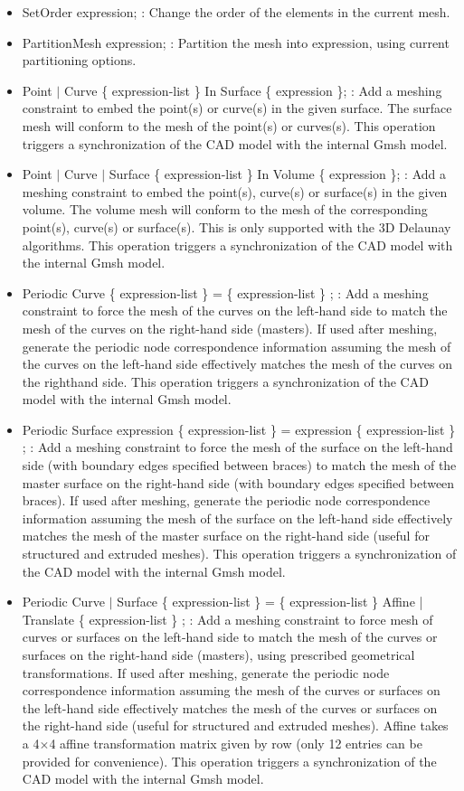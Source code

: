 \documentclass[dvipdfmx, 9pt, a4paper]{article}
\numberwithin{equation}{section}
\begin{document}
\begin{itemize}
\item SetOrder expression; : Change the order of the elements in the current mesh.
\item PartitionMesh expression; : Partition the mesh into expression, using current partitioning options.
\item Point $|$ Curve \{ expression-list \} In Surface \{ expression \}; : Add a meshing constraint to embed the point(s) or curve(s) in the given surface. The surface mesh will conform to the mesh of the point(s) or curves(s). This operation triggers a synchronization of the CAD model with the internal Gmsh model.
\item Point $|$ Curve $|$ Surface \{ expression-list \} In Volume \{ expression \}; : Add a meshing constraint to embed the point(s), curve(s) or surface(s) in the given volume. The volume mesh will conform to the mesh of the corresponding point(s), curve(s) or surface(s). This is only supported with the 3D Delaunay algorithms. This operation triggers a synchronization of the CAD model with the internal Gmsh
model.
\item Periodic Curve \{ expression-list \} = \{ expression-list \} ; : Add a meshing constraint to force the mesh of the curves on the left-hand side to match the mesh of the curves on the right-hand side (masters). If used after meshing, generate the periodic node correspondence information assuming the mesh of the curves on the left-hand side effectively matches the mesh of the curves on the righthand side. This operation triggers a synchronization of the CAD model with the internal Gmsh model.
\item Periodic Surface expression \{ expression-list \} = expression \{ expression-list \} ; : Add a meshing constraint to force the mesh of the surface on the left-hand side (with boundary edges specified between braces) to match the mesh of the master surface on the right-hand side (with boundary edges specified between braces). If used after meshing, generate the periodic node correspondence information assuming the mesh of the surface on the left-hand side effectively matches the mesh of the master surface on the right-hand side (useful for structured and extruded meshes). This operation triggers a synchronization of the CAD model with the internal Gmsh model.
\item Periodic Curve $|$ Surface \{ expression-list \} = \{ expression-list \} Affine | Translate \{ expression-list \} ; : Add a meshing constraint to force mesh of curves or surfaces on the left-hand side to match the mesh of the curves or surfaces on the right-hand side (masters), using prescribed geometrical transformations. If used after meshing, generate the periodic node correspondence information assuming the mesh of the curves or surfaces on the left-hand side effectively matches the mesh of the curves or surfaces on the right-hand side (useful for structured and extruded meshes). Affine takes a 4$\times$4 affine transformation matrix given by row (only 12 entries can be provided for convenience). This operation triggers a synchronization of the CAD model with the internal Gmsh model.

\end{itemize}
\end{document}
